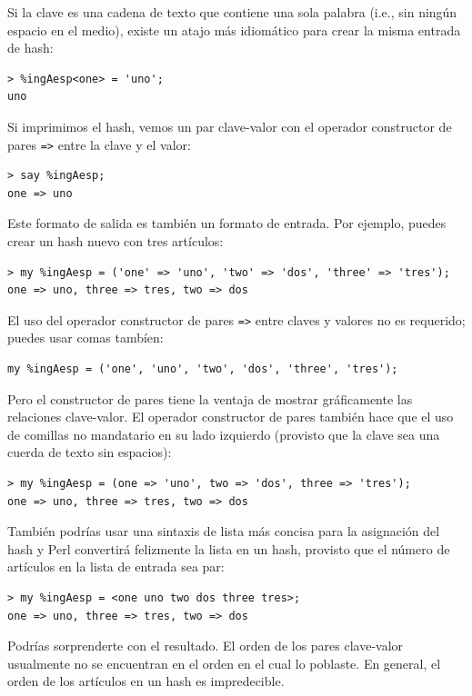 Si la clave es una cadena de texto que contiene una sola palabra
(i.e., sin ningún espacio en el medio), existe un atajo más 
idiomático para crear la misma entrada de hash:

\begin{verbatim}
> %ingAesp<one> = 'uno';
uno
\end{verbatim}
%
Si imprimimos el hash, vemos un par clave-valor con el 
operador constructor de pares \verb|=>| entre la clave y
el valor:

\begin{verbatim}
> say %ingAesp;
one => uno
\end{verbatim}
%
Este formato de salida es también un formato de entrada.
Por ejemplo, puedes crear un hash nuevo con tres artículos:

\begin{verbatim}
> my %ingAesp = ('one' => 'uno', 'two' => 'dos', 'three' => 'tres');
one => uno, three => tres, two => dos
\end{verbatim}
%

El uso del operador constructor de pares \verb|=>| entre claves y 
valores no es requerido; puedes usar comas tambíen:

\begin{verbatim}
my %ingAesp = ('one', 'uno', 'two', 'dos', 'three', 'tres');
\end{verbatim}
%

Pero el constructor de pares tiene la ventaja de mostrar
gráficamente las relaciones clave-valor. El operador constructor
de pares también hace que el uso de comillas no mandatario
en su lado izquierdo (provisto que la clave sea una cuerda 
de texto sin espacios):

\begin{verbatim}
> my %ingAesp = (one => 'uno', two => 'dos', three => 'tres');
one => uno, three => tres, two => dos
\end{verbatim}
%

También podrías usar una sintaxis de lista más concisa para la
asignación del hash y Perl convertirá felizmente la lista
en un hash, provisto que el número de artículos en la lista 
de entrada sea par:

\begin{verbatim}
> my %ingAesp = <one uno two dos three tres>;
one => uno, three => tres, two => dos
\end{verbatim}
%

Podrías sorprenderte con el resultado. El orden de los
pares clave-valor usualmente no se encuentran en el orden
en el cual lo poblaste. En general, el orden de los artículos
en un hash es impredecible.


